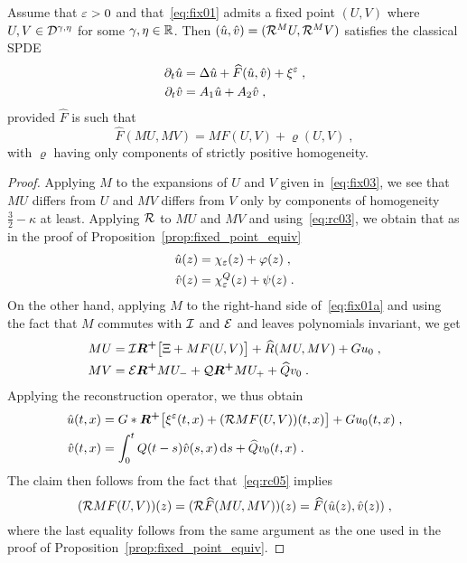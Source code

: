 \documentclass[reqno,11pt]{article}
\def\Rplus{\boldsymbol{R^+}}
\begin{document}
\begin{prop}
\label{prop:fixed_point_renorm}
Assume that $\varepsilon>0$ and that~\eqref{eq:fix01} admits a fixed point $(U,V)$
where $U, V\in{\mathcal D}^{\gamma,\eta}$ for some $\gamma, \eta\in\mathbb{R}$. Then
$(\hat u,\hat v)=({\mathcal R}^M U, {\mathcal R}^M V)$ satisfies the classical SPDE 
\begin{align}
\nonumber
\partial_t \hat u &= \Delta \hat u + \widehat F(\hat u,\hat v) + \xi^\eps\;, \\
\partial_t \hat v &= A_1 \hat u + A_2 \hat v\;,
\label{eq:rc04}
\end{align} 
provided $\widehat F$ is such that  
\begin{equation}
\label{eq:rc05}
\widehat F(MU,MV) = MF(U,V) + \varrho(U,V)\;, 
\end{equation} 
with $\varrho$ having only components of strictly positive homogeneity. 
\end{prop}
%
\begin{proof}
Applying $M$ to the expansions of $U$ and $V$ given in~\eqref{eq:fix03}, we see
that $MU$ differs from $U$ and $MV$ differs from $V$ only by components of
homogeneity $\frac32-\kappa$ at least. Applying ${\mathcal R}$ to $MU$ and $MV$ and
using~\eqref{eq:rc03}, we obtain that as in the proof
of Proposition~\ref{prop:fixed_point_equiv} 
\begin{align*}
\hat u(z) &= \chi_\varepsilon(z) + \varphi(z)\;, \\
\hat v(z) &= \chi^Q_\varepsilon(z) + \psi(z)\;.
\end{align*}
On the other hand, applying $M$ to the right-hand side of~\eqref{eq:fix01a} and
using the fact that $M$ commutes with ${\mathcal I}$ and ${\mathcal E}$ and leaves polynomials
invariant, we get 
\begin{align*}
 MU &= \cI\Rplus \bigbrak{\Xi + MF(U,V)} + \widehat R(MU,MV) + Gu_0\;,\\
 MV &= \cE\Rplus MU_- + \cQ\Rplus MU_+ + \widehat Qv_0\;. 
\end{align*}
Applying the reconstruction operator, we thus obtain 
\begin{align*}
 \hat u(t,x) &= G * \Rplus \bigbrak{\xi^\eps(t,x)+(\cR MF(U,V))(t,x)} +
Gu_0(t,x)\;, \\
 \hat v(t,x) &= \int_0^t Q(t-s)\hat v(s,x)\6s + \widehat Qv_0(t,x)\;.
\end{align*}
The claim then follows from the fact that~\eqref{eq:rc05} implies 
\[
({\mathcal R} MF(U,V))(z) 
= ({\mathcal R} \widehat F(MU,MV))(z)
= \widehat F(\hat u(z),\hat v(z))\;, 
\]
where the last equality follows from the same argument as the one used in the
proof of Proposition~\ref{prop:fixed_point_equiv}. 
\end{proof}
\end{document}
